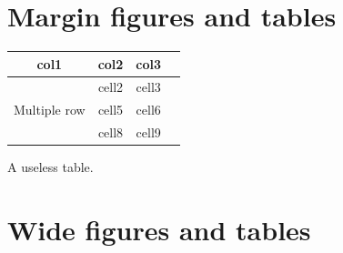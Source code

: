 \blindtext

\section{Margin figures and tables}

\blindtext

\begin{margintable}[*-6]
\begin{tabular}{ |c|c|c|c| } 
\hline
col1 & col2 & col3 \\
\hline
\multirow{3}{4em}{Multiple row} & cell2 & cell3 \\ 
& cell5 & cell6 \\ 
& cell8 & cell9 \\ 
\hline
\end{tabular}
\caption{A useless table.}
\end{margintable}

\section{Wide figures and tables}
